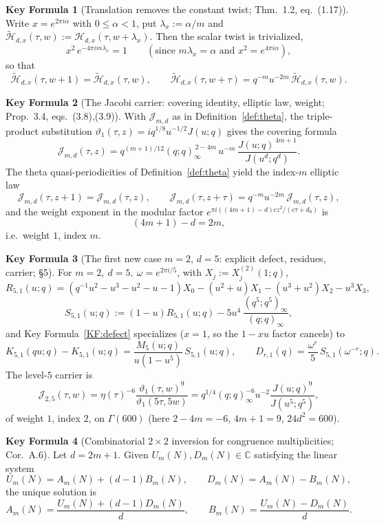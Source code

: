\documentclass[11pt]{article}
\newcommand{\C}{\mathbb{C}}
\newcommand{\JJ}{\mathcal{J}}
\theoremstyle{definition}
\newtheorem{keyformula}{Key Formula}
\begin{document}
\begin{keyformula}[Translation removes the constant twist; Thm.~1.2, eq.~(1.17)]\label{KF:untwist}
Write $x=e^{2\pi i\alpha}$ with $0\le\alpha<1$, put $\lambda_x:=\alpha/m$ and
$\widetilde{\mathcal H}_{d,x}(\tau,w):=\mathcal H_{d,x}(\tau,w+\lambda_x)$. Then the scalar twist
is trivialized,
\[
x^2\,e^{-4\pi i m\lambda_x}=1
\qquad(\text{since } m\lambda_x=\alpha \text{ and } x^2=e^{4\pi i\alpha}),
\]
so that
\[
\widetilde{\mathcal H}_{d,x}(\tau,w+1)=\widetilde{\mathcal H}_{d,x}(\tau,w),
\qquad
\widetilde{\mathcal H}_{d,x}(\tau,w+\tau)=q^{-m}u^{-2m}\,\widetilde{\mathcal H}_{d,x}(\tau,w).
\]
\end{keyformula}

\begin{keyformula}[The Jacobi carrier: covering identity, elliptic law, weight; Prop.~3.4, eqs.~(3.8),(3.9)]\label{KF:carrier}
With $\JJ_{m,d}$ as in Definition~\ref{def:theta}, the triple-product substitution
$\vartheta_1(\tau,z)=iq^{1/8}u^{-1/2}J(u;q)$ gives the covering formula
\[
\JJ_{m,d}(\tau,z)=q^{(m+1)/12}(q;q)_\infty^{\,2-4m}\,u^{-m}\,\frac{J(u;q)^{\,4m+1}}{J(u^d;q^d)}.
\]
The theta quasi-periodicities of Definition~\ref{def:theta} yield the index-$m$ elliptic law
\[
\JJ_{m,d}(\tau,z+1)=\JJ_{m,d}(\tau,z),
\qquad
\JJ_{m,d}(\tau,z+\tau)=q^{-m}u^{-2m}\,\JJ_{m,d}(\tau,z),
\]
and the weight exponent in the modular factor $e^{\pi i((4m+1)-d)cz^2/(c\tau+d_0)}$ is
\[
(4m+1)-d=2m,
\]
i.e.\ weight $1$, index $m$.
\end{keyformula}

\begin{keyformula}[The first new case $m=2$, $d=5$: explicit defect, residues, carrier; \S5]\label{KF:level5}
For $m=2,\ d=5,\ \omega=e^{2\pi i/5}$, with $X_j:=X_j^{(2)}(1;q)$,
\[
R_{5,1}(u;q)=(q^{-1}u^2-u^3-u^2-u-1)X_0-(u^2+u)X_1-(u^3+u^2)X_2-u^3X_3,
\]
\[
S_{5,1}(u;q):=(1-u)R_{5,1}(u;q)-5u^4\,\frac{(q^5;q^5)_\infty}{(q;q)_\infty},
\]
and Key Formula~\ref{KF:defect} specializes ($x=1$, so the $1-xu$ factor cancels) to
\[
K_{5,1}(qu;q)-K_{5,1}(u;q)=\frac{M_5(u;q)}{u(1-u^5)}\,S_{5,1}(u;q),
\qquad
D_{r,1}(q)=\frac{\omega^r}{5}\,S_{5,1}(\omega^{-r};q).
\]
The level-$5$ carrier is
\[
\JJ_{2,5}(\tau,w)=\eta(\tau)^{-6}\frac{\vartheta_1(\tau,w)^9}{\vartheta_1(5\tau,5w)}
=q^{1/4}(q;q)_\infty^{-6}u^{-2}\frac{J(u;q)^9}{J(u^5;q^5)},
\]
of weight $1$, index $2$, on $\Gamma(600)$ (here $2-4m=-6$, $4m+1=9$, $24d^2=600$).
\end{keyformula}

\begin{keyformula}[Combinatorial $2\times2$ inversion for congruence multiplicities; Cor.~A.6]\label{KF:combi}
Let $d=2m+1$. Given $U_m(N),D_m(N)\in\C$ satisfying the linear system
\[
U_m(N)=A_m(N)+(d-1)B_m(N),
\qquad
D_m(N)=A_m(N)-B_m(N),
\]
the unique solution is
\[
A_m(N)=\frac{U_m(N)+(d-1)D_m(N)}{d},
\qquad
B_m(N)=\frac{U_m(N)-D_m(N)}{d}.
\]
\end{keyformula}
\end{document}
